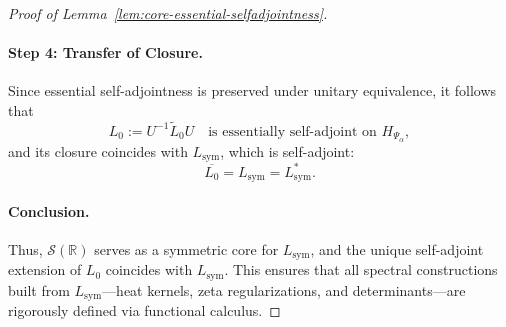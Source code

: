 \begin{proof}[Proof of Lemma~\ref{lem:core-essential-selfadjointness}]
\paragraph{Step 4: Transfer of Closure.}
Since essential self-adjointness is preserved under unitary equivalence, it follows that
\[
L_0 := U^{-1} \widetilde{L}_0 U \quad \text{is essentially self-adjoint on } H_{\Psi_\alpha},
\]
and its closure coincides with \( L_{\mathrm{sym}} \), which is self-adjoint:
\[
\overline{L_0} = L_{\mathrm{sym}} = L_{\mathrm{sym}}^*.
\]

\paragraph{Conclusion.}
Thus, \( \mathcal{S}(\mathbb{R}) \) serves as a symmetric core for \( L_{\mathrm{sym}} \), and the unique self-adjoint extension of \( L_0 \) coincides with \( L_{\mathrm{sym}} \). This ensures that all spectral constructions built from \( L_{\mathrm{sym}} \)—heat kernels, zeta regularizations, and determinants—are rigorously defined via functional calculus.
\end{proof}
